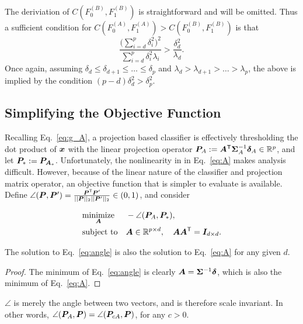 \documentclass[10pt]{article}
\begin{document}
The deriviation of $C(F_0^{(B)}, F_1^{(B)})$ is straightforward and will be omitted. Thus a sufficient condition for $C(F_0^{(A)}, F_1^{(A)}) > C(F_0^{(B)}, F_1^{(B)})$ is that
$$ \frac{\bigl(\sum_{i=d}^{p} \delta_i^{2}\bigr)^{2}}{\sum_{i=d}^{p} \delta_i^{2} \lambda_i} > \frac{\delta_{d}^{2}}{\lambda_d}. $$
Once again, assuming $\delta_{d} \leq \delta_{d+1} \leq \dots \leq \delta_{p}$ and $\lambda_d > \lambda_{d+1} > \dots > \lambda_{p}$, the above is implied by the condition $(p - d) \delta_{d}^{2} > \delta_p^2$. 
 

\subsection{Simplifying the Objective Function}

Recalling Eq.~\eqref{eq:g_A}, a projection based classifier is effectively thresholding the dot product of $\boldsymbol{x}$ with the linear projection operator $\boldsymbol{P}_A :=\boldsymbol{A}^{\mathsf{T}} \boldsymbol{\Sigma}_A^{-1} \boldsymbol{\delta}_A \in \mathbb{R}^p$, and let $\boldsymbol{P}_*:=\boldsymbol{P}_{\boldsymbol{A}_*}$.  Unfortunately, the nonlinearity in in Eq.~\eqref{eq:A} makes analysis difficult.
However, because of the linear nature of the classifier and projection matrix operator, an objective function that is simpler to evaluate is available.
Define
$\angle(\boldsymbol{P},\boldsymbol{P}') = \frac{ \boldsymbol{P}^{\mathsf{T}} \boldsymbol{P}'}{||\boldsymbol{P}||_2 ||\boldsymbol{P}'||_2} \in (0,1)$, and consider

\begin{equation} \label{eq:angle}
\begin{aligned}
& \underset{\boldsymbol{A}}{\text{minimize}}
& & -\angle(\boldsymbol{P}_A,\boldsymbol{P}_*),
\\ & \text{subject to} & & \boldsymbol{A} \in \mathbb{R}^{p \times d}, \quad \boldsymbol{A} \boldsymbol{A}^{\mathsf{T}} = \boldsymbol{I}_{d \times d}.
\end{aligned}
\end{equation}

\begin{lem} \label{l:angle}
The solution to Eq.~\eqref{eq:angle} is also the solution to Eq.~\eqref{eq:A} for any given $d$.
\end{lem}

\begin{proof}
The minimum of Eq.~\eqref{eq:angle} is clearly $\boldsymbol{A}=\boldsymbol{\Sigma}^{-1} \boldsymbol{\delta}$, which is also the minimum of Eq.~\eqref{eq:A}.
\end{proof}


\begin{remark}
$\angle$ is merely the angle between two vectors, and is therefore scale invariant.  In other words, $\angle(\boldsymbol{P}_A,\boldsymbol{P})=\angle(\boldsymbol{P}_{c A},\boldsymbol{P})$, for any $c > 0$.
\end{remark}
\end{document}
